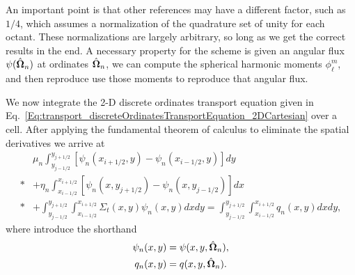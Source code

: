 An important point is that other references may have a different factor, such as $1/4$, which assumes a normalization of the quadrature set of unity for each octant. These normalizations are largely arbitrary, so long as we get the correct results in the end. A necessary property for the scheme is given an angular flux $\psi(\hat{\mathbf{\Omega}}_n)$ at ordinates $\hat{\mathbf{\Omega}}_n$, we can compute the spherical harmonic moments $\phi_\ell^m$, and then reproduce use those moments to reproduce that angular flux.


We now integrate the 2-D discrete ordinates transport equation given in Eq.~\eqref{Eq:transport_discreteOrdinatesTransportEquation_2DCartesian} over a cell. After applying the fundamental theorem of calculus to eliminate the spatial derivatives we arrive at
\begin{align}
    &\mu_n  \int_{y_{j-1/2}}^{y_{j+1/2}} \left[ \psi_n(x_{i+1/2},y) - \psi_n(x_{i-1/2},y) \right] dy \nonumber \\*
  &+ \eta_n \int_{x_{i-1/2}}^{x_{i+1/2}} \left[ \psi_n(x,y_{j+1/2}) - \psi_n(x,y_{j-1/2}) \right] dx \nonumber \\*
  &+ \int_{y_{j-1/2}}^{y_{j+1/2}} \int_{x_{i-1/2}}^{x_{i+1/2}} \Sigma_t(x,y) \psi_n(x,y) dx dy 
  = \int_{y_{j-1/2}}^{y_{j+1/2}} \int_{x_{i-1/2}}^{x_{i+1/2}} q_n(x,y) dx dy ,
\end{align}
where introduce the shorthand
\begin{subequations}
\begin{align}
  \psi_n(x,y) &= \psi(x,y,\hat{\mathbf{\Omega}}_n) , \\
  q_n(x,y) &= q(x,y,\hat{\mathbf{\Omega}}_n) .
\end{align}
\end{subequations}

